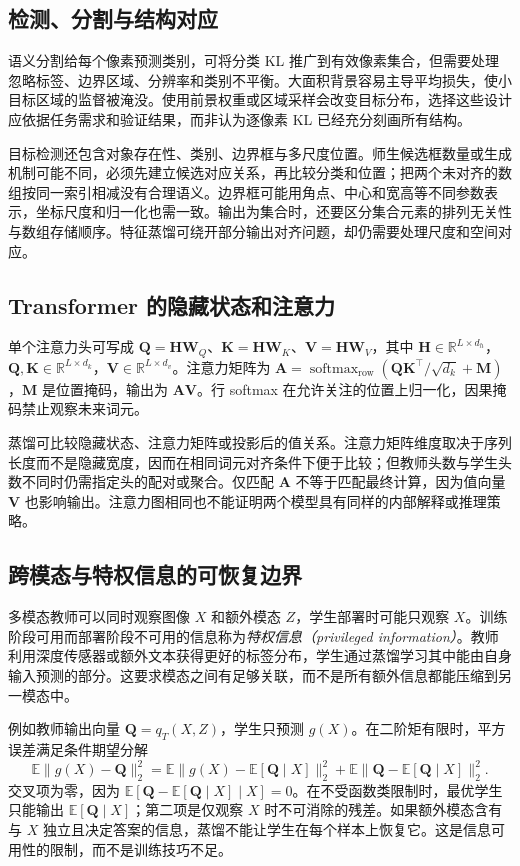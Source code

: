 \documentclass[UTF8,12pt,a4paper,fontset=fandol]{ctexart}
\begin{document}
\subsection{检测、分割与结构对应}
语义分割给每个像素预测类别，可将分类 KL 推广到有效像素集合，但需要处理忽略标签、边界区域、分辨率和类别不平衡。大面积背景容易主导平均损失，使小目标区域的监督被淹没。使用前景权重或区域采样会改变目标分布，选择这些设计应依据任务需求和验证结果，而非认为逐像素 KL 已经充分刻画所有结构。

目标检测还包含对象存在性、类别、边界框与多尺度位置。师生候选框数量或生成机制可能不同，必须先建立候选对应关系，再比较分类和位置；把两个未对齐的数组按同一索引相减没有合理语义。边界框可能用角点、中心和宽高等不同参数表示，坐标尺度和归一化也需一致。输出为集合时，还要区分集合元素的排列无关性与数组存储顺序。特征蒸馏可绕开部分输出对齐问题，却仍需要处理尺度和空间对应。

\subsection{Transformer 的隐藏状态和注意力}
单个注意力头可写成 $\mathbf Q=\mathbf H\mathbf W_Q$、$\mathbf K=\mathbf H\mathbf W_K$、$\mathbf V=\mathbf H\mathbf W_V$，其中 $\mathbf H\in\mathbb R^{L\times d_h}$，$\mathbf Q,\mathbf K\in\mathbb R^{L\times d_k}$，$\mathbf V\in\mathbb R^{L\times d_v}$。注意力矩阵为 $\mathbf A=\operatorname{softmax}_{\mathrm{row}}(\mathbf Q\mathbf K^\top/\sqrt{d_k}+\mathbf M)$，$\mathbf M$ 是位置掩码，输出为 $\mathbf A\mathbf V$。行 softmax 在允许关注的位置上归一化，因果掩码禁止观察未来词元。

蒸馏可比较隐藏状态、注意力矩阵或投影后的值关系。注意力矩阵维度取决于序列长度而不是隐藏宽度，因而在相同词元对齐条件下便于比较；但教师头数与学生头数不同时仍需指定头的配对或聚合。仅匹配 $\mathbf A$ 不等于匹配最终计算，因为值向量 $\mathbf V$ 也影响输出。注意力图相同也不能证明两个模型具有同样的内部解释或推理策略。

\subsection{跨模态与特权信息的可恢复边界}
多模态教师可以同时观察图像 $X$ 和额外模态 $Z$，学生部署时可能只观察 $X$。训练阶段可用而部署阶段不可用的信息称为\emph{特权信息（privileged information）}。教师利用深度传感器或额外文本获得更好的标签分布，学生通过蒸馏学习其中能由自身输入预测的部分。这要求模态之间有足够关联，而不是所有额外信息都能压缩到另一模态中。

例如教师输出向量 $\mathbf Q=q_T(X,Z)$，学生只预测 $g(X)$。在二阶矩有限时，平方误差满足条件期望分解
\[
 \mathbb E\|g(X)-\mathbf Q\|_2^2
 =\mathbb E\|g(X)-\mathbb E[\mathbf Q\mid X]\|_2^2
 +\mathbb E\|\mathbf Q-\mathbb E[\mathbf Q\mid X]\|_2^2.
\]
交叉项为零，因为 $\mathbb E[\mathbf Q-\mathbb E[\mathbf Q\mid X]\mid X]=0$。在不受函数类限制时，最优学生只能输出 $\mathbb E[\mathbf Q\mid X]$；第二项是仅观察 $X$ 时不可消除的残差。如果额外模态含有与 $X$ 独立且决定答案的信息，蒸馏不能让学生在每个样本上恢复它。这是信息可用性的限制，而不是训练技巧不足。
\end{document}
